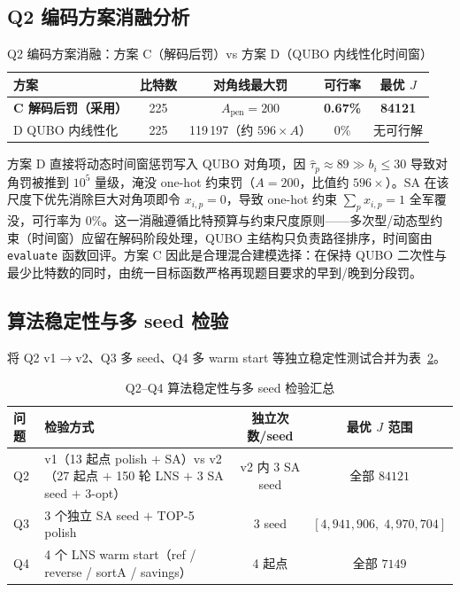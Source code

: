 \documentclass[UTF8,12pt,a4paper]{ctexart}
\begin{document}
\subsection{Q2 编码方案消融分析}
\label{sec:sens-ablation}

\begin{table}[H]
    \centering
    \caption{Q2 编码方案消融：方案 C（解码后罚）vs 方案 D（QUBO 内线性化时间窗）}
    \label{tab:sens-encoding}
    \begin{tabular}{lcccc}
        \toprule
        方案 & 比特数 & 对角线最大罚 & 可行率 & 最优 $J$ \\
        \midrule
        \textbf{C 解码后罚（采用）}    & 225 & $A_{\text{pen}}\!=\!200$ & \textbf{0.67\%} & \textbf{84121} \\
        D QUBO 内线性化            & 225 & 119\,197（约 $596\!\times\!A$）& 0\% & 无可行解 \\
        \bottomrule
    \end{tabular}
\end{table}

方案 D 直接将动态时间窗惩罚写入 QUBO 对角项，因 $\hat\tau_p\!\approx\!89\!\gg\!b_i\!\le\!30$ 导致对角罚被推到 $10^5$ 量级，淹没 one-hot 约束罚（$A\!=\!200$，比值约 $596\!\times$）。SA 在该尺度下优先消除巨大对角项即令 $x_{i,p}\!=\!0$，导致 one-hot 约束 $\sum_p x_{i,p}\!=\!1$ 全军覆没，可行率为 $0\%$。这一消融遵循比特预算与约束尺度原则——多次型/动态型约束（时间窗）应留在解码阶段处理，QUBO 主结构只负责路径排序，时间窗由 \texttt{evaluate} 函数回评。方案 C 因此是合理混合建模选择：在保持 QUBO 二次性与最少比特数的同时，由统一目标函数严格再现题目要求的早到/晚到分段罚。

\subsection{算法稳定性与多 seed 检验}
\label{sec:sens-stability}

将 Q2 v1$\to$v2、Q3 多 seed、Q4 多 warm start 等独立稳定性测试合并为表~\ref{tab:sens-stability}。

\begin{table}[H]
    \centering
    \caption{Q2--Q4 算法稳定性与多 seed 检验汇总}
    \label{tab:sens-stability}
    \footnotesize
    \begin{tabular}{lp{6cm}cc}
        \toprule
        问题 & 检验方式 & 独立次数/seed & 最优 $J$ 范围 \\
        \midrule
        Q2 & v1（13 起点 polish $+$ SA）vs v2（27 起点 $+$ 150 轮 LNS $+$ 3 SA seed $+$ 3-opt）& v2 内 3 SA seed & 全部 $84121$ \\
        Q3 & 3 个独立 SA seed $+$ TOP-5 polish & 3 seed & $[4{,}941{,}906,\;4{,}970{,}704]$ \\
        Q4 & 4 个 LNS warm start（ref / reverse / sortA / savings）& 4 起点 & 全部 $7149$ \\
        \bottomrule
    \end{tabular}
\end{table}
\end{document}

